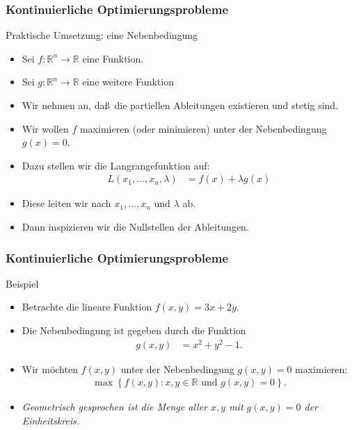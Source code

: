 \documentclass{beamer}
\newcommand\RR{\mathbb R}
\newcommand\cbc[1]{\left\{{#1}\right\}}
\renewcommand{\oe}{\"o}
\newcommand{\mytitle}{Kontinuierliche Optimierungsprobleme}
\begin{document}
\begin{frame}\frametitle{\mytitle}
	\begin{block}{Praktische Umsetzung: eine Nebenbedingung}
	\begin{itemize}
		\item Sei $f:\RR^n\to\RR$ eine Funktion.
		\item Sei $g:\RR^n\to\RR$ eine weitere Funktion
		\item Wir nehmen an, da\ss\ die partiellen Ableitungen existieren und stetig sind.
		\item Wir wollen $f$ maximieren (oder minimieren) unter der \alert{Nebenbedingung} $g(x)=0$.
		\item Dazu stellen wir die \alert{Langrangefunktion} auf:
			\begin{align*}
				L(x_1,\ldots,x_n,\lambda)&=f(x)+\lambda g(x)
			\end{align*}
		\item Diese leiten wir nach $x_1,\ldots,x_n$ und $\lambda$ ab.
		\item Dann inspizieren wir die Nullstellen der Ableitungen.
	\end{itemize}
	\end{block}
\end{frame}

\begin{frame}\frametitle{\mytitle}
	\begin{block}{Beispiel}
	\begin{itemize}
		\item Betrachte die lineare Funktion $f(x,y)=3x+2y$.
		\item Die Nebenbedingung ist gegeben durch die Funktion
			\begin{align*}
				g(x,y)&=x^2+y^2-1.
			\end{align*}
		\item Wir m\oe chten $f(x,y)$ unter der Nebenbedingung $g(x,y)=0$ maximieren:
			\begin{align*}
				\max\cbc{f(x,y):x,y\in\RR\mbox{ und }g(x,y)=0}.
			\end{align*}
		\item \itshape Geometrisch gesprochen ist die Menge aller $x,y$ mit $g(x,y)=0$ der Einheitskreis.
	\end{itemize}
	\end{block}
\end{frame}
\end{document}
